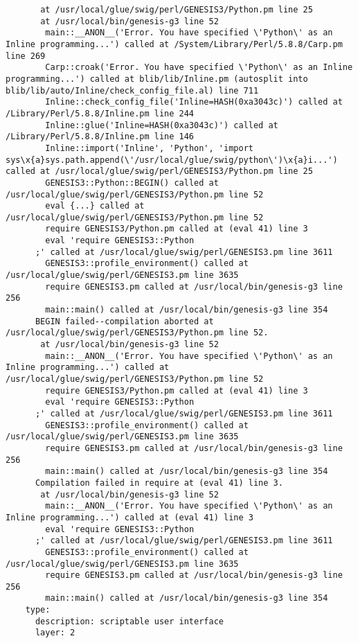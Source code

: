 \documentclass[12pt]{article}
\begin{document}
\begin{verbatim}
       at /usr/local/glue/swig/perl/GENESIS3/Python.pm line 25
       at /usr/local/bin/genesis-g3 line 52
      	main::__ANON__('Error. You have specified \'Python\' as an Inline programming...') called at /System/Library/Perl/5.8.8/Carp.pm line 269
      	Carp::croak('Error. You have specified \'Python\' as an Inline programming...') called at blib/lib/Inline.pm (autosplit into blib/lib/auto/Inline/check_config_file.al) line 711
      	Inline::check_config_file('Inline=HASH(0xa3043c)') called at /Library/Perl/5.8.8/Inline.pm line 244
      	Inline::glue('Inline=HASH(0xa3043c)') called at /Library/Perl/5.8.8/Inline.pm line 146
      	Inline::import('Inline', 'Python', 'import sys\x{a}sys.path.append(\'/usr/local/glue/swig/python\')\x{a}i...') called at /usr/local/glue/swig/perl/GENESIS3/Python.pm line 25
      	GENESIS3::Python::BEGIN() called at /usr/local/glue/swig/perl/GENESIS3/Python.pm line 52
      	eval {...} called at /usr/local/glue/swig/perl/GENESIS3/Python.pm line 52
      	require GENESIS3/Python.pm called at (eval 41) line 3
      	eval 'require GENESIS3::Python
      ;' called at /usr/local/glue/swig/perl/GENESIS3.pm line 3611
      	GENESIS3::profile_environment() called at /usr/local/glue/swig/perl/GENESIS3.pm line 3635
      	require GENESIS3.pm called at /usr/local/bin/genesis-g3 line 256
      	main::main() called at /usr/local/bin/genesis-g3 line 354
      BEGIN failed--compilation aborted at /usr/local/glue/swig/perl/GENESIS3/Python.pm line 52.
       at /usr/local/bin/genesis-g3 line 52
      	main::__ANON__('Error. You have specified \'Python\' as an Inline programming...') called at /usr/local/glue/swig/perl/GENESIS3/Python.pm line 52
      	require GENESIS3/Python.pm called at (eval 41) line 3
      	eval 'require GENESIS3::Python
      ;' called at /usr/local/glue/swig/perl/GENESIS3.pm line 3611
      	GENESIS3::profile_environment() called at /usr/local/glue/swig/perl/GENESIS3.pm line 3635
      	require GENESIS3.pm called at /usr/local/bin/genesis-g3 line 256
      	main::main() called at /usr/local/bin/genesis-g3 line 354
      Compilation failed in require at (eval 41) line 3.
       at /usr/local/bin/genesis-g3 line 52
      	main::__ANON__('Error. You have specified \'Python\' as an Inline programming...') called at (eval 41) line 3
      	eval 'require GENESIS3::Python
      ;' called at /usr/local/glue/swig/perl/GENESIS3.pm line 3611
      	GENESIS3::profile_environment() called at /usr/local/glue/swig/perl/GENESIS3.pm line 3635
      	require GENESIS3.pm called at /usr/local/bin/genesis-g3 line 256
      	main::main() called at /usr/local/bin/genesis-g3 line 354
    type:
      description: scriptable user interface
      layer: 2
\end{verbatim}
\end{document}
